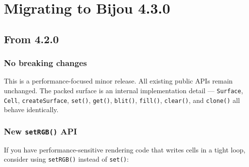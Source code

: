 \chapter{Migrating to Bijou 4.3.0}\label{record-266}

\smallskip

\section{From 4.2.0}\label{record-266-from-4.2.0}

\subsection{No breaking changes}\label{record-266-no-breaking-changes}

This is a performance-focused minor release. All existing public APIs remain unchanged. The packed surface is an internal implementation detail --- \texttt{S\allowbreak{}u\allowbreak{}r\allowbreak{}f\allowbreak{}a\allowbreak{}c\allowbreak{}e}, \texttt{C\allowbreak{}e\allowbreak{}l\allowbreak{}l}, \texttt{c\allowbreak{}r\allowbreak{}e\allowbreak{}a\allowbreak{}t\allowbreak{}e\allowbreak{}S\allowbreak{}u\allowbreak{}r\allowbreak{}f\allowbreak{}a\allowbreak{}c\allowbreak{}e}, \texttt{s\allowbreak{}e\allowbreak{}t\allowbreak{}(\allowbreak{})}, \texttt{g\allowbreak{}e\allowbreak{}t\allowbreak{}(\allowbreak{})}, \texttt{b\allowbreak{}l\allowbreak{}i\allowbreak{}t\allowbreak{}(\allowbreak{})}, \texttt{f\allowbreak{}i\allowbreak{}l\allowbreak{}l\allowbreak{}(\allowbreak{})}, \texttt{c\allowbreak{}l\allowbreak{}e\allowbreak{}a\allowbreak{}r\allowbreak{}(\allowbreak{})}, and \texttt{c\allowbreak{}l\allowbreak{}o\allowbreak{}n\allowbreak{}e\allowbreak{}(\allowbreak{})} all behave identically.

\subsection{\texorpdfstring{New \texttt{s\allowbreak{}e\allowbreak{}t\allowbreak{}R\allowbreak{}G\allowbreak{}B\allowbreak{}(\allowbreak{})} API}{New  API}}\label{record-266-new-setrgb-api}

If you have performance-sensitive rendering code that writes cells in a tight loop, consider using \texttt{s\allowbreak{}e\allowbreak{}t\allowbreak{}R\allowbreak{}G\allowbreak{}B\allowbreak{}(\allowbreak{})} instead of \texttt{s\allowbreak{}e\allowbreak{}t\allowbreak{}(\allowbreak{})}:

